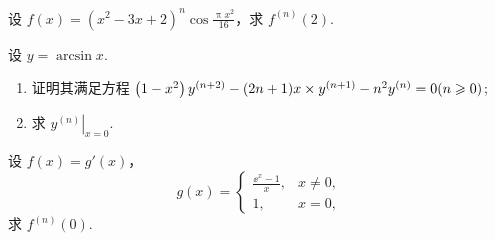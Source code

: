 	\begin{ti}
		设 $f(x) = \left( x^{2} - 3x + 2 \right)^{n} \cos \frac{\uppi x^{2}}{16}$，求 $f^{(n)}(2)$.
	\end{ti}

	\begin{ti}
		设 $y = \arcsin x$.
		\begin{enumerate}
			\item 证明其满足方程 $\left( 1 - x^{2} \right) y^{(n+2)} - (2n + 1)\* x\times y^{(n+1)} - n^{2} y^{(n)} = 0 (n \geq 0)$;
			\item 求 $\left. y^{(n)} \right|_{x = 0}$.
		\end{enumerate}
	\end{ti}

	\begin{ti}
		设 $f(x) = g'(x)$，
		\[
			g(x) = \begin{cases}
				\frac{\ee^{x} - 1}{x}, & x \ne 0,\\
				1, & x = 0,
			\end{cases}
		\]
		求 $f^{(n)}(0)$.
	\end{ti}